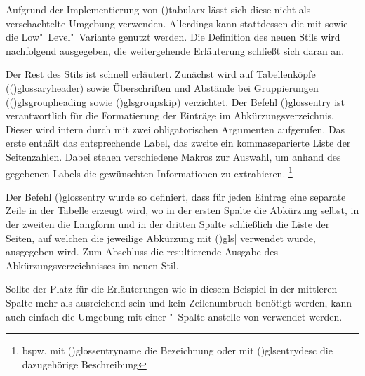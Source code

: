 \documentclass[%
  english,ngerman,%
  cdgeometry=no,DIV=12,%
  cd=false,cdfont=false,cdtitle=true,%
  headings=normal,%
  automark,%
  listof=toc,%
]{tudscrartcl}
\begin{document}
Aufgrund der Implementierung von \Environment(){tabularx} 
lässt sich diese nicht als verschachtelte Umgebung verwenden. Allerdings kann 
stattdessen die mit  sowie  die 
Low"~Level"~Variante genutzt werden. Die Definition des neuen Stils 
 wird nachfolgend ausgegeben, die weitergehende 
Erläuterung schließt sich daran an.
%
\CodeHook{\let\newglossarystyle\renewglossarystyle}
\begin{Hint*}

\end{Hint*}
%
Der Rest des Stils ist schnell erläutert. Zunächst wird auf Tabellenköpfe 
(\Macro(){glossaryheader}) sowie Überschriften und Abstände 
bei Gruppierungen (\Macro(){glsgroupheading} sowie 
\Macro(){glsgroupskip}) verzichtet. Der Befehl 
\Macro(){glossentry} ist verantwortlich für die 
Formatierung der Einträge im Abkürzungsverzeichnis. Dieser wird intern durch 
 mit zwei obligatorischen Argumenten aufgerufen. Das erste 
enthält das entsprechende Label, das zweite ein kommaseparierte Liste der 
Seitenzahlen. Dabei stehen verschiedene Makros zur Auswahl, um anhand des 
gegebenen Labels die gewünschten Informationen zu extrahieren.%
\footnote{%
  bspw. mit \Macro(){glossentryname} die Bezeichnung oder 
  mit \Macro(){glsentrydesc} die dazugehörige Beschreibung%
}

Der Befehl \Macro(){glossentry} wurde so definiert, dass 
für jeden Eintrag eine separate Zeile in der Tabelle erzeugt wird, wo in der 
ersten Spalte die Abkürzung selbst, in der zweiten die Langform und in der 
dritten Spalte schließlich die Liste der Seiten, auf welchen die jeweilige 
Abkürzung mit \Macro(){gls|} verwendet 
wurde, ausgegeben wird. Zum Abschluss die resultierende Ausgabe des 
Abkürzungsverzeichnisses im neuen Stil.
%
\begin{Hint}
\printacronyms[style=acrotabularx]
\end{Hint}
\begin{quoting}[rightmargin=0pt]
\InputCode
\end{quoting}
%
Sollte der Platz für die Erläuterungen wie in diesem Beispiel in der mittleren 
Spalte mehr als ausreichend sein und kein Zeilenumbruch benötigt werden, kann 
auch einfach die Umgebung  mit einer "~Spalte 
anstelle von  verwendet werden.
\end{document}
